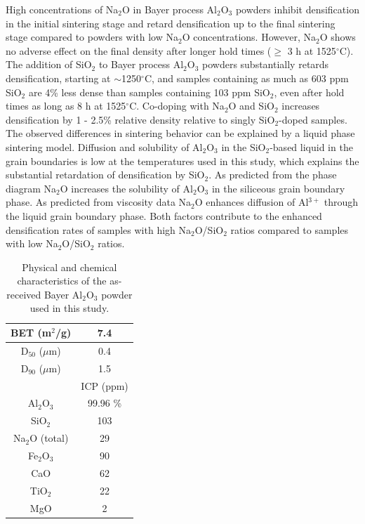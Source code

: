 High concentrations of Na$_{2}$O in Bayer process Al$_{2}$O$_{3}$ powders inhibit densification in the initial sintering stage and retard densification up to the final sintering stage compared to powders with low Na$_{2}$O concentrations. However, Na$_{2}$O shows no adverse effect on the final density after longer hold times ($\geq$ 3 h at 1525$^{\circ}$C). The addition of SiO$_{2}$ to Bayer process Al$_{2}$O$_{3}$ powders substantially retards densification, starting at $\sim$1250$^{\circ}$C, and samples containing as much as 603 ppm SiO$_{2}$ are 4\% less dense than samples containing 103 ppm SiO$_{2}$, even after hold times as long as 8 h at 1525$^{\circ}$C. Co-doping with Na$_{2}$O and SiO$_{2}$ increases densification by 1 - 2.5\% relative density relative to singly SiO$_{2}$-doped samples. The observed differences in sintering behavior can be explained by a liquid phase sintering model. Diffusion and solubility of Al$_{2}$O$_{3}$ in the SiO$_{2}$-based liquid in the grain boundaries is low at the temperatures used in this study, which explains the substantial retardation of densification by SiO$_{2}$. As predicted from the phase diagram Na$_{2}$O increases the solubility of Al$_{2}$O$_{3}$ in the siliceous grain boundary phase. As predicted from viscosity data Na$_{2}$O enhances diffusion of Al$^{3+}$ through the liquid grain boundary phase. Both factors contribute to the enhanced densification rates of samples with high Na$_{2}$O/SiO$_{2}$ ratios compared to samples with low Na$_{2}$O/SiO$_{2}$ ratios.

\newpage
\begin{table}[H]
	\caption{Physical and chemical characteristics of the as-received Bayer Al$_{2}$O$_{3}$ powder used in this study.}
	\centering
	\begin{tabular}{ | c | c | }
		\hline
		BET (m$^{2}$/g) & 7.4 \\
		\hline
		D$_{50}$ ($\mu$m) & 0.4 \\
		\hline
		D$_{90}$ ($\mu$m) & 1.5 \\
		\hline
		 & ICP (ppm) \\
		\hline
		Al$_{2}$O$_{3}$ & 99.96 \% \\
		\hline
		SiO$_{2}$ & 103 \\
		\hline
		Na$_{2}$O (total) & 29 \\
		\hline
		Fe$_{2}$O$_{3}$ & 90 \\
		\hline
		CaO & 62 \\
		\hline
		TiO$_{2}$ & 22 \\
		\hline
		MgO & 2 \\
		\hline
	\end{tabular}
	\label{Ch2-table:table1}
\end{table}
\clearpage

